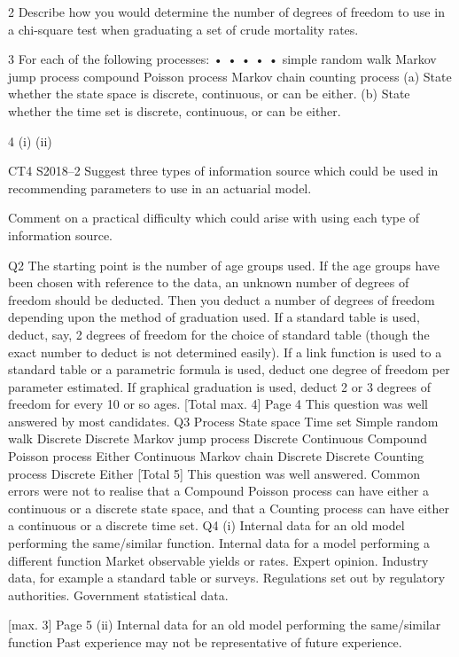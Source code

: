\documentclass[a4paper,12pt]{article}
\begin{document}
2 Describe how you would determine the number of degrees of freedom to use in a
chi-square test when graduating a set of crude mortality rates.

3 For each of the following processes:
•
•
•
•
•
simple random walk
Markov jump process
compound Poisson process
Markov chain
counting process
(a)
State whether the state space is discrete, continuous, or can be either.
(b)
State whether the time set is discrete, continuous, or can be either.

4
(i)
(ii)

CT4 S2018–2
Suggest three types of information source which could be used in
recommending parameters to use in an actuarial model.

Comment on a practical difficulty which could arise with using each type of
information source.



Q2
The starting point is the number of age groups used. 
If the age groups have been chosen with reference to the data,
an unknown number of degrees of freedom should be deducted. 
Then you deduct a number of degrees of freedom depending upon
the method of graduation used. 
If a standard table is used, deduct, say, 2 degrees of freedom for the
choice of standard table (though the exact number to deduct is not
determined easily). 
If a link function is used to a standard table or a parametric formula
is used, deduct one degree of freedom per parameter estimated. 
If graphical graduation is used, deduct 2 or 3 degrees of freedom
for every 10 or so ages. 
[Total max. 4]
Page 4
This question was well answered by most candidates.
Q3
Process State space Time set Simple random walk Discrete Discrete 
Markov jump process Discrete Continuous 
Compound Poisson process Either Continuous 
Markov chain Discrete Discrete 
Counting process Discrete Either 
[Total 5]
This question was well answered. Common errors were not to
realise that a Compound Poisson process can have either a
continuous or a discrete state space, and that a Counting process
can have either a continuous or a discrete time set.
Q4
(i)
Internal data for an old model performing the same/similar function. 
Internal data for a model performing a different function 
Market observable yields or rates. 
Expert opinion. 
Industry data, for example a standard table or surveys. 
Regulations set out by regulatory authorities. 
Government statistical data.

[max. 3]
Page 5
(ii)
Internal data for an old model performing the same/similar function
Past experience may not be representative of future experience.
\end{document}

